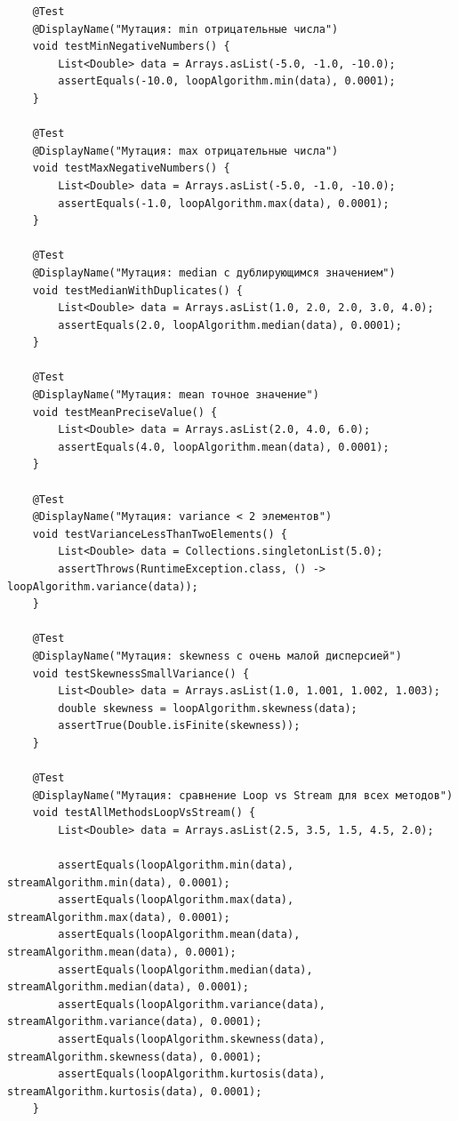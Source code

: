 \begin{verbatim}
    @Test
    @DisplayName("Мутация: min отрицательные числа")
    void testMinNegativeNumbers() {
        List<Double> data = Arrays.asList(-5.0, -1.0, -10.0);
        assertEquals(-10.0, loopAlgorithm.min(data), 0.0001);
    }

    @Test
    @DisplayName("Мутация: max отрицательные числа")
    void testMaxNegativeNumbers() {
        List<Double> data = Arrays.asList(-5.0, -1.0, -10.0);
        assertEquals(-1.0, loopAlgorithm.max(data), 0.0001);
    }

    @Test
    @DisplayName("Мутация: median с дублирующимся значением")
    void testMedianWithDuplicates() {
        List<Double> data = Arrays.asList(1.0, 2.0, 2.0, 3.0, 4.0);
        assertEquals(2.0, loopAlgorithm.median(data), 0.0001);
    }

    @Test
    @DisplayName("Мутация: mean точное значение")
    void testMeanPreciseValue() {
        List<Double> data = Arrays.asList(2.0, 4.0, 6.0);
        assertEquals(4.0, loopAlgorithm.mean(data), 0.0001);
    }

    @Test
    @DisplayName("Мутация: variance < 2 элементов")
    void testVarianceLessThanTwoElements() {
        List<Double> data = Collections.singletonList(5.0);
        assertThrows(RuntimeException.class, () -> loopAlgorithm.variance(data));
    }

    @Test
    @DisplayName("Мутация: skewness с очень малой дисперсией")
    void testSkewnessSmallVariance() {
        List<Double> data = Arrays.asList(1.0, 1.001, 1.002, 1.003);
        double skewness = loopAlgorithm.skewness(data);
        assertTrue(Double.isFinite(skewness));
    }

    @Test
    @DisplayName("Мутация: сравнение Loop vs Stream для всех методов")
    void testAllMethodsLoopVsStream() {
        List<Double> data = Arrays.asList(2.5, 3.5, 1.5, 4.5, 2.0);

        assertEquals(loopAlgorithm.min(data), streamAlgorithm.min(data), 0.0001);
        assertEquals(loopAlgorithm.max(data), streamAlgorithm.max(data), 0.0001);
        assertEquals(loopAlgorithm.mean(data), streamAlgorithm.mean(data), 0.0001);
        assertEquals(loopAlgorithm.median(data), streamAlgorithm.median(data), 0.0001);
        assertEquals(loopAlgorithm.variance(data), streamAlgorithm.variance(data), 0.0001);
        assertEquals(loopAlgorithm.skewness(data), streamAlgorithm.skewness(data), 0.0001);
        assertEquals(loopAlgorithm.kurtosis(data), streamAlgorithm.kurtosis(data), 0.0001);
    }


\end{verbatim}
